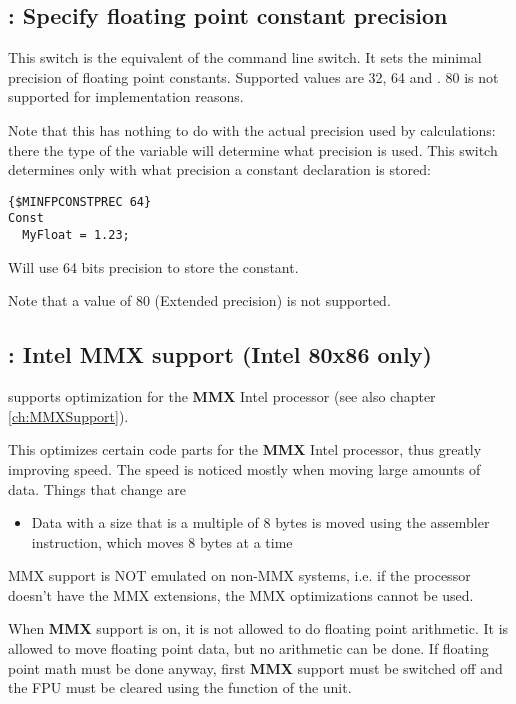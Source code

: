 \subsection{ : Specify floating point constant precision}
\label{se:Minfpconstprec}

This switch is the equivalent of the  command line switch. It
sets the minimal precision of floating point constants. 
Supported values are 32, 64 and . 
80 is not supported for implementation reasons.

Note that this has nothing to do with the actual precision used by
calculations: there the type of the variable will determine what precision
is used. This switch determines only with what precision a constant 
declaration is stored:
\begin{verbatim}
{$MINFPCONSTPREC 64}
Const
  MyFloat = 1.23;
\end{verbatim}
Will use 64 bits precision to store the constant.

Note that a value of 80 (Extended precision) is not supported.

\subsection{ : Intel MMX support (Intel 80x86 only)}

\fpc supports optimization for the \textbf{MMX} Intel
processor (see also chapter \ref{ch:MMXSupport}).

This optimizes certain code parts for the \textbf{MMX} Intel
processor, thus greatly improving speed. The speed is noticed mostly when
moving large amounts of data. Things that change are
\begin{itemize}
\item Data with a size that is a multiple of 8 bytes is moved using the
 assembler instruction, which moves 8 bytes at a time
\end{itemize}
\begin{remark}MMX support is NOT emulated on non-MMX systems, i.e. if
the processor doesn't have the MMX extensions, the MMX optimizations cannot
be used.
\end{remark}
When \textbf{MMX} support is on, it is not allowed to do floating point
arithmetic. It is allowed to move floating point data, but no arithmetic
can be done. If floating point math must be done anyway, first \textbf{MMX}
 support must be switched off and the FPU must be cleared using the 
function of the  unit.

